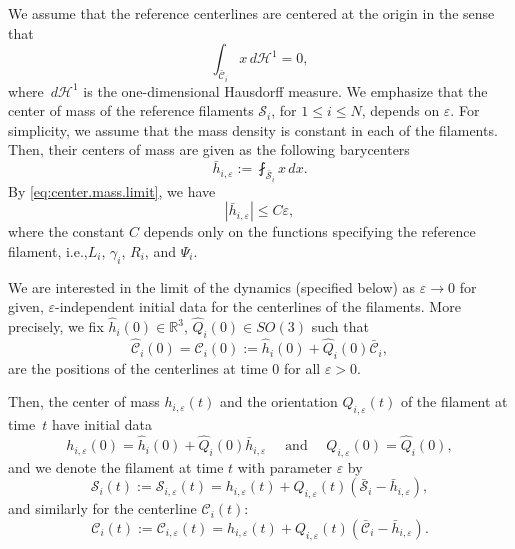 \documentclass[11pt]{article}
\newcommand{\ie}{i.e.,\xspace}
\newcommand{\R}{\mathbb{R}}
\let\eps\varepsilon
\newcommand{\cS}{\mathcal{S}}
\newcommand{\dd}{\,d}
\theoremstyle{definition}
\theoremstyle{remark}
\begin{document}
We assume that the reference centerlines are centered at the origin in the sense that\vspace*{-3pt}
\begin{equation} \label{eq:center.mass.limit}
\int_{\bar {\mathcal C}_i} x \dd \mathcal H^1 = 0,
\end{equation}
where $\dd \mathcal{H}^1$ is the one-dimensional Hausdorff measure.
We emphasize that the center of mass of the reference filaments $\mathcal S_i$, for $ 1\leq i \leq N$, depends on $\eps$. For simplicity, we assume that the mass density is constant in each of the filaments. Then, their centers of mass are given as the following barycenters
\begin{equation}
\bar h_{i,\eps} := \fint_{\bar {\cS}_i} x \dd x.
\end{equation}
By \eqref{eq:center.mass.limit}, we have\vspace*{-3pt}
\begin{equation} \label{eq:center.mass.small}
|\bar h_{i,\eps}| \leq C \eps,
\end{equation}
where the constant $C$ depends only on the functions specifying the reference filament, \ie $L_i$, $\gamma_i$, $R_i$, and $\Psi_i$.

We are interested in the limit of the dynamics (specified below) as $\eps \to 0$ for given, $\eps$-independent initial data for the centerlines of the filaments. More precisely,
we fix $\hat h_i(0) \in \R^3$, $\hat Q_i(0) \in SO(3)$ such that
\begin{equation}
\label{dimathC}
\hat{\mathcal C}_i (0) = \mathcal C_i (0) := \hat h_i(0) + \hat Q_i(0) \bar {\mathcal C}_i,
\end{equation}
are the positions of the centerlines at time $0$ for all $\eps >0$.

Then, the center of mass $h_{i,\eps}(t)$ and the orientation $Q_{i,\eps}(t)$ of the filament at time~$t$ have initial data\vspace*{-3pt}
\begin{equation} \label{eq:initial.positions}
h_{i,\eps}(0) = \hat h_i(0) + {\hat Q_{i}(0)} \bar h_{i,\eps} \quad \text{ and } \quad Q_{i,\eps}(0) = \hat Q_i(0),
\end{equation}
and we denote the filament at time $t$ with parameter $\eps$ by\vspace*{-3pt}
\begin{equation} \label{def:Stourne}
\mathcal S_i(t) := \mathcal S_{i,\eps}(t) = h_{i,\eps}(t) + {Q_{i,\eps}}(t) (\bar {\mathcal S}_i - \bar h_{i,\eps}),
\end{equation}
and similarly for the centerline $\mathcal C_i(t)$:\vspace*{-3pt}
\begin{equation*}
\mathcal C_i(t) := \mathcal C_{i,\eps}(t) = h_{i,\eps}(t) + {Q_{i,\eps}}(t) (\bar {\mathcal C}_i - \bar h_{i,\eps}).
\end{equation*}
\end{document}
